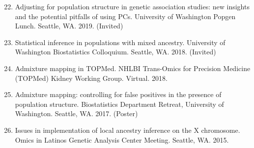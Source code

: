 \documentclass[margin]{res}
\newenvironment{benumerate}[1]{
    \let\oldItem\item
    \def\item{\addtocounter{enumi}{-2}\oldItem}
    
    \begin{enumerate}
    \setcounter{enumi}{#1}
    \addtocounter{enumi}{1}
}{
    \end{enumerate}
}
\begin{document}
\begin{resume}
\begin{benumerate}{21}
\item Adjusting for population structure in genetic association studies: new insights and the potential pitfalls of using PCs. University of Washington Popgen Lunch. Seattle, WA. 2019.  (Invited)





\item %
Statistical inference in populations with mixed ancestry. University of Washington Biostatistics Colloquium. Seattle, WA. 2018.  (Invited)

\item Admixture mapping in TOPMed. NHLBI Trans-Omics for Precision Medicine (TOPMed) Kidney Working Group. Virtual. 2018.  


\item %
Admixture mapping: controlling for false positives in the presence of population structure. Biostatistics Department Retreat, University of Washington. Seattle, WA. 2017. (Poster)



\item %
Issues in implementation of local ancestry inference on the X chromosome. Omics in Latinos Genetic Analysis Center Meeting. Seattle, WA. 2015.


\end{benumerate}
\end{resume}
\end{document}
